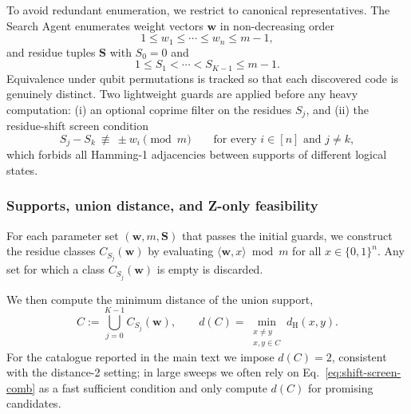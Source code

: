 \documentclass[pdflatex,sn-nature]{sn-jnl}%
\theoremstyle{thmstyleone}%
\theoremstyle{thmstyletwo}%
\theoremstyle{thmstylethree}%
\begin{document}
To avoid redundant enumeration, we restrict to canonical representatives. The Search Agent enumerates weight vectors $\mathbf w$ in non-decreasing order
\[
  1\le w_1\le\cdots\le w_n\le m-1,
\]
and residue tuples $\mathbf S$ with $S_0=0$ and
\[
  1\le S_1<\cdots<S_{K-1}\le m-1.
\]
Equivalence under qubit permutations is tracked so that each discovered code is genuinely distinct. Two lightweight guards are applied before any heavy computation:
(i) an optional coprime filter on the residues $S_j$, and
(ii) the residue-shift screen condition
\begin{equation}
    \label{eq:shift-screen-comb}
    S_j - S_k \ \not\equiv\ \pm w_i \pmod m \qquad \text{for every } i\in[n] \text{ and } j\neq k,
\end{equation}
which forbids all Hamming-1 adjacencies between supports of different logical states.

\subsubsection{Supports, union distance, and Z-only feasibility}

For each parameter set $(\mathbf w,m,\mathbf S)$ that passes the initial guards, we construct the residue classes $C_{S_j}(\mathbf w)$ by evaluating
$\langle \mathbf w,x\rangle \bmod m$ for all $x\in\{0,1\}^n$. Any set for which a class $C_{S_j}(\mathbf w)$ is empty is discarded.

We then compute the minimum distance of the union support,
\begin{equation}
  C :=\bigcup_{j=0}^{K-1} C_{S_{j}}(\mathbf w),\qquad
  d(C)=\min_{\substack{x\ne y\\x,y\in C}} d_{\mathrm H}(x,y).
  \label{eq:distance2}
\end{equation}
For the catalogue reported in the main text we impose $d(C)=2$, consistent with the distance-2 setting; in large sweeps we often rely on Eq.~\eqref{eq:shift-screen-comb} as a fast sufficient condition and only compute $d(C)$ for promising candidates.
\end{document}
